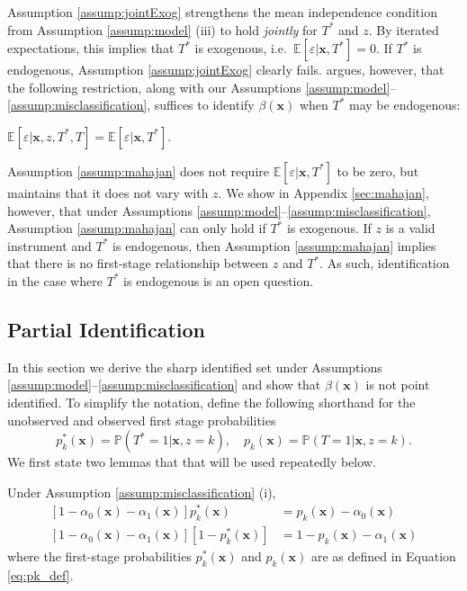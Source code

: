 Assumption \ref{assump:jointExog} strengthens the mean independence condition from Assumption \ref{assump:model} (iii) to hold \emph{jointly} for $T^*$ and $z$.
By iterated expectations, this implies that $T^*$ is exogenous, i.e.\ $\mathbb{E}[\varepsilon|\mathbf{x},T^*] = 0$.
If $T^*$ is endogenous, Assumption \ref{assump:jointExog} clearly fails.
\cite{Mahajan} argues, however, that the following restriction, along with our Assumptions \ref{assump:model}--\ref{assump:misclassification}, suffices to identify $\beta(\mathbf{x})$ when $T^*$ may be endogenous:
\begin{assump} \mbox{}
  \label{assump:mahajan}
  $\mathbb{E}[\varepsilon|\mathbf{x}, z, T^*, T] = \mathbb{E}[\varepsilon|\mathbf{x},T^*]$.
\end{assump}
Assumption \ref{assump:mahajan} does not require $\mathbb{E}[\varepsilon|\mathbf{x},T^*]$ to be zero, but maintains that it does not vary with $z$.
We show in Appendix \ref{sec:mahajan}, however, that under 
Assumptions \ref{assump:model}--\ref{assump:misclassification}, Assumption \ref{assump:mahajan} can only hold if $T^*$ is exogenous.
If $z$ is a valid instrument and $T^*$ is endogenous, then Assumption \ref{assump:mahajan} implies that there is no first-stage relationship between $z$ and $T^*$.
As such, identification in the case where $T^*$ is endogenous is an open question. 




\subsection{Partial Identification}
\label{sec:partial}

In this section we derive the sharp identified set under Assumptions \ref{assump:model}--\ref{assump:misclassification} and show that  $\beta(\mathbf{x})$ is not point identified.
To simplify the notation, define the following shorthand for the unobserved and observed first stage probabilities
\begin{equation}
  p^*_k(\mathbf{x}) = \mathbb{P}(T^*=1|\mathbf{x},z=k), \quad
  p_k(\mathbf{x}) = \mathbb{P}(T=1|\mathbf{x},z=k).
  \label{eq:pk_def}
\end{equation}
We first state two lemmas that that will be used repeatedly below.
\begin{lem}
\label{lem:p_pstar}
  Under Assumption \ref{assump:misclassification} (i),
\begin{align*}
  \left[ 1 - \alpha_0(\mathbf{x}) - \alpha_1(\mathbf{x}) \right]p^*_k(\mathbf{x}) &= p_k(\mathbf{x}) - \alpha_0(\mathbf{x})\\
  \left[ 1 - \alpha_0(\mathbf{x}) - \alpha_1(\mathbf{x}) \right]\left[1 - p^*_k(\mathbf{x}) \right]&= 1 - p_k(\mathbf{x}) - \alpha_1(\mathbf{x})
\end{align*}
where the first-stage probabilities $p_k^*(\mathbf{x})$ and $p_k(\mathbf{x})$ are as defined in Equation \ref{eq:pk_def}.
\end{lem} 


